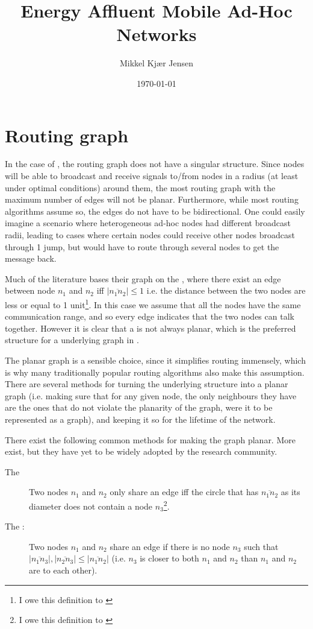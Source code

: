 \documentclass[letter, 12pt, english, draft]{article}
\title{Energy Affluent Mobile Ad-Hoc Networks}
\author{Mikkel Kjær Jensen}
\date{\today}
\begin{document}
\pagestyle{fancy}

\section{Routing graph}
In the case of \manet, the routing graph does not have a singular structure. Since nodes will be able to broadcast and receive signals to/from nodes in a radius (at least under optimal conditions) around them, the most routing graph with the maximum number of edges will not be planar. Furthermore, while most routing algorithms assume so, the edges do not have to be bidirectional. One could easily imagine a scenario where heterogeneous ad-hoc nodes had different broadcast radii, leading to cases where certain nodes could receive other nodes broadcast through 1 jump, but would have to route through several nodes to get the message back.

Much of the literature bases their graph on the \udg, where there exist an edge between node $n_1$ and $n_2$ iff $|\overline{n_1n_2}| \leq 1$ i.e. the distance between the two nodes are less or equal to 1 unit\footnote{I owe this definition to \cite{gopher}}. In this case we assume that all the nodes have the same communication range, and so every edge indicates that the two nodes can talk together. However it is clear that a \udg is not always planar, which is the preferred structure for a underlying graph in \anet. 

The planar graph is a sensible choice, since it simplifies routing immensely, which is why many traditionally popular routing algorithms also make this assumption. There are several methods for turning the underlying structure into a planar graph (i.e. making sure that for any given node, the only neighbours they have are the ones that do not violate the planarity of the graph, were it to be represented as a graph), and keeping it so for the lifetime of the network. 

There exist the following common methods for making the graph planar. More exist, but they have yet to be widely adopted by the research community.
\begin{description}
\item[The \gabe] Two nodes $n_1$ and $n_2$ only share an edge iff the circle that has $\overline{n_1n_2}$ as its diameter does not contain a node $n_3$\footnote{I owe this definition to \cite{gopher}}. 
\item[The \rng:] Two nodes $n_1$ and $n_2$ share an edge if there is no node $n_3$ such that $|\overline{n_1n_3}|, |\overline{n_2n_3}| \leq |\overline{n_1n_2}|$ (i.e. $n_3$ is closer to both $n_1$ and $n_2$ than $n_1$ and $n_2$ are to each other).
\end{description}
\end{document}
